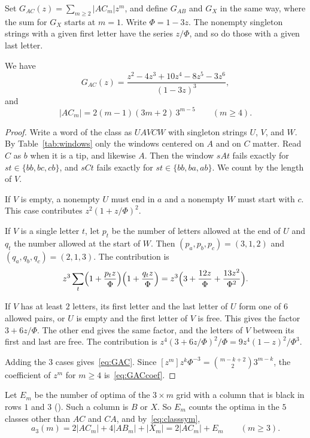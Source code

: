 Set $G_{AC}(z)=\sum_{m\ge2}|AC_m|z^m$, and define $G_{AB}$ and $G_X$ in the same
way, where the sum for $G_X$ starts at $m=1$. Write $\Phi=1-3z$. The nonempty
singleton strings with a given first letter have the series $z/\Phi$, and so do
those with a given last letter.

\begin{proposition}\label{prop:threeGAC}
We have
\begin{equation}\label{eq:GAC}
G_{AC}(z)=\frac{z^2-4z^3+10z^4-8z^5-3z^6}{(1-3z)^3},
\end{equation}
and
\begin{equation}\label{eq:GACcoef}
|AC_m|=2(m-1)(3m+2)\,3^{m-5}\qquad(m\ge4).
\end{equation}
\end{proposition}

\begin{proof}
Write a word of the class as $UAVCW$ with singleton strings $U$, $V$, and $W$.
By Table~\ref{tab:windows} only the windows centered on $A$ and on $C$ matter.
Read $C$ as $b$ when it is a tip, and likewise $A$. Then the window $sAt$ fails
exactly for $st\in\{bb,bc,cb\}$, and $sCt$ fails exactly for
$st\in\{bb,ba,ab\}$. We count by the length of $V$.

If $V$ is empty, a nonempty $U$ must end in $a$ and a nonempty $W$ must start
with $c$. This case contributes $z^2(1+z/\Phi)^2$.

If $V$ is a single letter $t$, let $p_t$ be the number of letters allowed at the
end of $U$ and $q_t$ the number allowed at the start of $W$. Then
$(p_a,p_b,p_c)=(3,1,2)$ and $(q_a,q_b,q_c)=(2,1,3)$. The contribution is
\[
z^3\sum_t\Bigl(1+\frac{p_tz}{\Phi}\Bigr)\Bigl(1+\frac{q_tz}{\Phi}\Bigr)
=z^3\Bigl(3+\frac{12z}{\Phi}+\frac{13z^2}{\Phi^2}\Bigr).
\]

If $V$ has at least $2$ letters, its first letter and the last letter of $U$
form one of $6$ allowed pairs, or $U$ is empty and the first letter of $V$ is
free. This gives the factor $3+6z/\Phi$. The other end gives the same factor,
and the letters of $V$ between its first and last are free. The contribution
is $z^4(3+6z/\Phi)^2/\Phi=9z^4(1-z)^2/\Phi^3$.

Adding the $3$ cases gives~\eqref{eq:GAC}. Since
$[z^m]z^k\Phi^{-3}=\binom{m-k+2}23^{m-k}$, the coefficient of $z^m$ for $m\ge4$
is~\eqref{eq:GACcoef}.
\end{proof}

Let $E_m$ be the number of optima of the $3\times m$ grid with a column that is
black in rows $1$ and $3$ (). Such a column is $B$ or $X$. So
$E_m$ counts the optima in the $5$ classes other than $AC$ and $CA$, and
by~\eqref{eq:classsym},
\begin{equation}\label{eq:classsum}
a_3(m)=2|AC_m|+4|AB_m|+|X_m|=2|AC_m|+E_m\qquad(m\ge3).
\end{equation}


